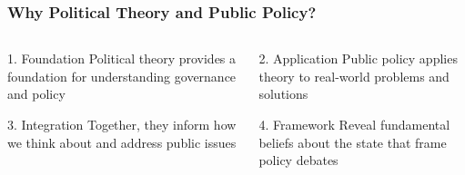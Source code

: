 \documentclass[10pt]{beamer}
\begin{document}
\begin{frame}
\frametitle{Why Political Theory and Public Policy?}

\begin{columns}
\begin{column}{0.48\textwidth}
\begin{block}{1. Foundation}
\pause
Political theory provides a foundation for understanding governance and policy
\end{block}

\vspace{0.3cm}

\begin{block}{3. Integration}
\pause
Together, they inform how we think about and address public issues
\end{block}
\end{column}

\begin{column}{0.48\textwidth}
\begin{block}{2. Application}
\pause
Public policy applies theory to real-world problems and solutions
\end{block}

\vspace{0.3cm}

\begin{block}{4. Framework}
\pause
Reveal fundamental beliefs about the state that frame policy debates
\end{block}
\end{column}
\end{columns}

\end{frame}
\end{document}
